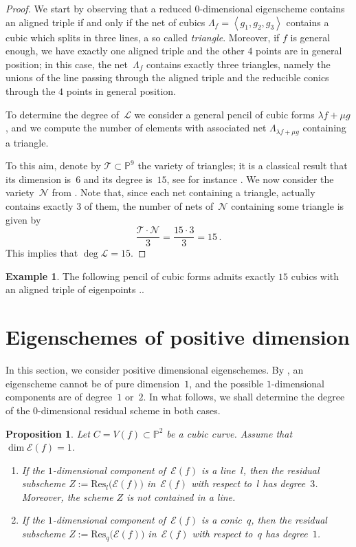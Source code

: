 \documentclass[a4paper, 11pt, reqno]{amsart}
\theoremstyle{plain}
\newtheorem{prop}[lemma]{Proposition}
\theoremstyle{definition}
\newtheorem{es}[lemma]{Example}
\newcommand{\p}{\mathbb{P}}
\newcommand{\sL}{\mathcal{L}}
\newcommand{\Eig}[1]{\mathcal{E}\!\left( {#1} \right)}
\begin{document}
\begin{proof}
We start by observing that a reduced $0$-dimensional eigenscheme contains an aligned triple if and only if the net of cubics
$\Lambda_f = \left\langle g_1, g_2, g_3 \right\rangle$ contains a cubic which splits in three lines, a so called \emph{triangle}. Moreover, if $f$ is general enough, we have exactly one aligned triple and the other $4$ points are in general position; in this case, the net~$\Lambda_f$ contains exactly three triangles, namely the unions of the line passing through the aligned triple and the reducible conics through the $4$ points in general position.

To determine the degree of~$\sL$ we consider a general pencil of cubic forms $\lambda f + \mu g$, and we compute the number of elements with associated net $\Lambda_{\lambda f + \mu g}$ containing a triangle.

To this aim, denote by $\mathcal{T} \subset \p^9$ the variety of triangles; it is a classical result that its dimension is~$6$ and its degree is~$15$,
see for instance \cite[Section~2.2.2]{3264}. We now consider the variety~$\mathcal{N}$ from .
Note that, since each net containing a triangle, actually contains exactly $3$ of them, the number of nets of~$\mathcal{N}$ containing some triangle is given by
%
\[
  \frac{\mathcal{T} \cdot \mathcal{N}}{3} = \frac{{15} \cdot {3}}{3} = 15 \,.
\]
%
This implies that $\deg \sL = 15$.
\end{proof}

\begin{es}
The following pencil of cubic forms admits exactly $15$ cubics with an aligned triple of eigenpoints ..
\end{es}


\section{Eigenschemes of positive dimension}
\label{positive_dim}

In this section, we consider positive dimensional eigenschemes.
By \cite{BGV}, an eigenscheme cannot be of pure dimension~$1$, and the possible $1$-dimensional components are of degree~$1$ or~$2$.
In what follows, we shall determine the degree of the $0$-dimensional residual scheme in both cases.

\begin{prop}
\label{p2}
Let $C = V(f) \subset \p^2$ be a cubic curve.
Assume that $\dim \Eig{f} = 1$.
%
\begin{enumerate}
  \item If the $1$-dimensional component of~$\Eig{f}$ is a line~$l$,
  then the residual subscheme $Z := \mathrm{Res}_l \bigl( \Eig{f} \bigr)$ in~$\Eig{f}$ with respect to~$l$ has degree~$3$. Moreover, the scheme $Z$ is not contained in a line.
  \item If the $1$-dimensional component of~$\Eig{f}$ is a conic~$q$,
  then the residual subscheme $Z := \mathrm{Res}_q \bigl( \Eig{f} \bigr)$ in~$\Eig{f}$ with respect to~$q$ has degree~$1$.
\end{enumerate}
%
\end{prop}
\end{document}
